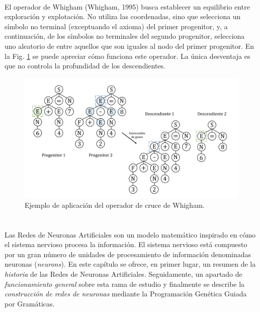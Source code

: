 \documentclass[spanish,a4paper,12pt,twoside]{report}
\begin{document}
        \subsubsection*{\vspace{-0.5cm}{\normalsize Operador de Whigham}}
        \vspace{-0.5cm}
        El operador de Whigham (Whigham, 1995) busca establecer un equilibrio entre exploración y explotación. No utiliza las coordenadas, sino que selecciona un símbolo no terminal (exceptuando el axioma) del primer progenitor, y, a continuación, de los símbolos no terminales del segundo progenitor, selecciona uno aleatorio de entre aquellos que son iguales al nodo del primer progenitor. En la Fig. \ref{fig:9} se puede apreciar cómo funciona este operador. La única desventaja es que no controla la profundidad de los descendientes. \par
        \begin{figure}[H]
          \centering
          \includegraphics[width = 1\textwidth]{resources/Fig9.pdf}
          \caption{Ejemplo de aplicación del operador de cruce de Whigham.}
          \label{fig:9}
        \end{figure} \par
 
  \newpage\cleardoublepage
    
  \chapter{\vspace{-3cm}{\LARGE 3. Redes de Neuronas Artificiales}}
  \setcounter{figure}{9}
  \vspace{-1cm}
  Las Redes de Neuronas Artificiales son un modelo matemático inspirado en cómo el sistema nervioso procesa la información. El sistema nervioso está compuesto por un gran número de unidades de procesamiento de información denominadas neuronas (\emph{neurons}). En este capítulo se ofrece, en primer lugar, un resumen de la \emph{historia} de las Redes de Neuronas Artificiales. Seguidamente, un apartado de \emph{funcionamiento general} sobre esta rama de estudio y finalmente se describe la \emph{construcción de redes de neuronas} mediante la Programación Genética Guiada por Gramáticas. \par
  
\end{document}
